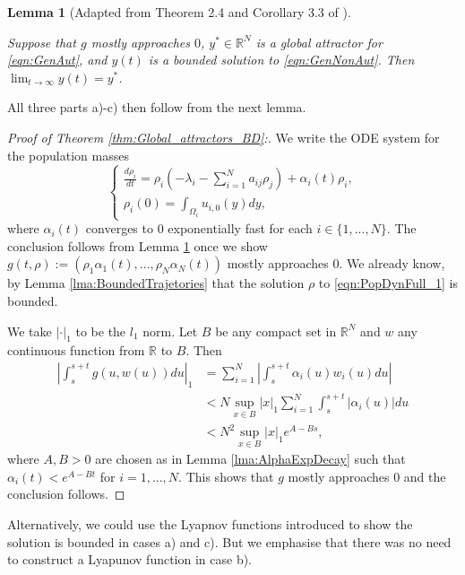 \documentclass{article}
\newtheorem{lemma}{Lemma}[section]
\begin{document}
\begin{lemma}[Adapted from Theorem 2.4 and Corollary 3.3 of \cite{strauss1967asymptotically}]\label{lma:AsympAut}

    Suppose that $g$ mostly approaches $0$, $y^{*}\in\mathbb{R}^N$ is a global attractor for \eqref{eqn:GenAut}, and   $y(t)$ is a bounded solution to \eqref{eqn:GenNonAut}. Then
 $\lim_{t\rightarrow\infty}y(t)=y^{*}$.
\end{lemma}

All three parts a)-c) then follow from the next lemma. 

\begin{proof}[Proof of Theorem \ref{thm:Global_attractors_BD}:]
     We write the ODE system for the population masses 
\begin{equation}\label{eqn:PopDynFull_1}
    \begin{cases}
        \frac{d\rho_i}{dt}=\rho_i\left(-\lambda_i-\sum_{i=1}^{N}a_{ij}\rho_j\right)+\alpha_i(t)\rho_i,\\
        \rho_i(0)=\int_{\Omega_i}u_{i,0}(y)dy,
    \end{cases}
\end{equation}
where $\alpha_i(t)$ converges to $0$ exponentially fast for each $i\in\{1,...,N\}$. The conclusion follows from Lemma \ref{lma:AsympAut} once we show $g(t,\rho):=(\rho_1\alpha_1(t),...,\rho_N\alpha_N(t))$ mostly approaches $0$. We already know, by Lemma \ref{lma:BoundedTrajetories} that the solution $\rho$ to \eqref{eqn:PopDynFull_1} is bounded.

We take $|\cdot{}|_1$ to be the $l_1$ norm. Let $B$ be any compact set in $\mathbb{R}^N$ and $w$ any continuous function from $\mathbb{R}$ to $B$. Then
\begin{align*}
   \left\vert \int_{s}^{s+t}g(u,w(u))du\right\vert_1&= \sum_{i=1}^N\left\vert \int_{s}^{s+t}\alpha_i(u)w_i(u)du\right\vert\\
   &<N\sup_{x\in{B}}|x|_1\sum_{i=1}^N\int_{s}^{s+t}|\alpha_i(u)|du\\
   &<N^2\sup_{x\in{B}}|x|_1e^{A-B{s}},
\end{align*}
where $A,B>0$ are chosen as in Lemma \ref{lma:AlphaExpDecay} such that $\alpha_i(t)<e^{A-Bt}$ for $i=1,...,N$. This shows that $g$ mostly approaches $0$ and the conclusion follows.

\end{proof}

Alternatively, we could use the Lyapnov functions introduced to show the solution is bounded in cases a) and c). But we emphasise that there was no need to construct a Lyapunov function in case b).  
\end{document}
